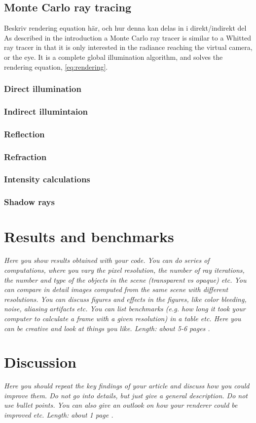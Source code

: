 \documentclass[]{report}   %
\begin{document}
\section{Monte Carlo ray tracing}
Beskriv rendering equation här, och hur denna kan delas in i direkt/indirekt del
As described in the introduction a Monte Carlo ray tracer is similar to a Whitted ray tracer in that it is only interested in the radiance reaching the virtual camera, or the eye. It is a complete global illumination algorithm, and solves the rendering equation, \autoref{eq:rendering}.
\subsection{Direct illumination}
\subsection{Indirect illumintaion}
\subsection{Reflection}
\subsection{Refraction}
\subsection{Intensity calculations}
\subsection{Shadow rays}

\chapter{Results and benchmarks}
\emph{Here you show results obtained with your code. You can do series of computations, where you vary the pixel resolution, the number of ray iterations, the number and type of the objects in the scene (transparent vs opaque) etc. You can compare in detail images computed from the same scene with different resolutions. You can discuss figures and effects in the figures, like color bleeding, noise, aliasing artifacts etc. You can list benchmarks (e.g. how long it took your computer to calculate a frame with a given resolution) in a table etc. Here you can be creative and look at things you like. 
Length: about 5-6 pages .}


\chapter{Discussion}
\emph{Here you should repeat the key findings of your article and discuss how you could improve them. 
Do not go into details, but just give a general description. 
Do not use bullet points. 
You can also give an outlook on how your renderer could be improved etc. 
Length: about 1 page .}



\end{document}
